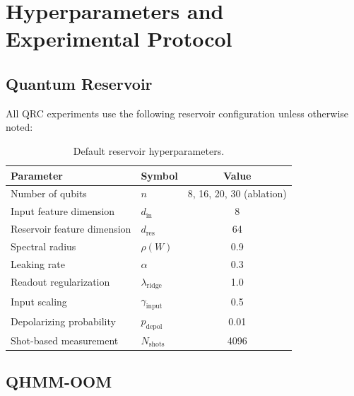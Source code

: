 
\chapter{Hyperparameters and Experimental Protocol}
\label{app:hyperparameters}

\section{Quantum Reservoir}

All QRC experiments use the following reservoir configuration unless
otherwise noted:

\begin{table}[htbp]
  \centering
  \caption{Default reservoir hyperparameters.}
  \label{tab:reservoir_hyperparams}
  \begin{tabular}{@{}llc@{}}
    \toprule
    Parameter & Symbol & Value \\
    \midrule
    Number of qubits & $n$ & 8, 16, 20, 30 (ablation) \\
    Input feature dimension & $d_{\mathrm{in}}$ & 8 \\
    Reservoir feature dimension & $d_{\mathrm{res}}$ & 64 \\
    Spectral radius & $\rho(W)$ & 0.9 \\
    Leaking rate & $\alpha$ & 0.3 \\
    Readout regularization & $\lambda_{\mathrm{ridge}}$ & 1.0 \\
    Input scaling & $\gamma_{\mathrm{input}}$ & 0.5 \\
    Depolarizing probability & $p_{\mathrm{depol}}$ & 0.01 \\
    Shot-based measurement & $N_{\mathrm{shots}}$ & 4096 \\
    \bottomrule
  \end{tabular}
\end{table}


\section{QHMM-OOM}



